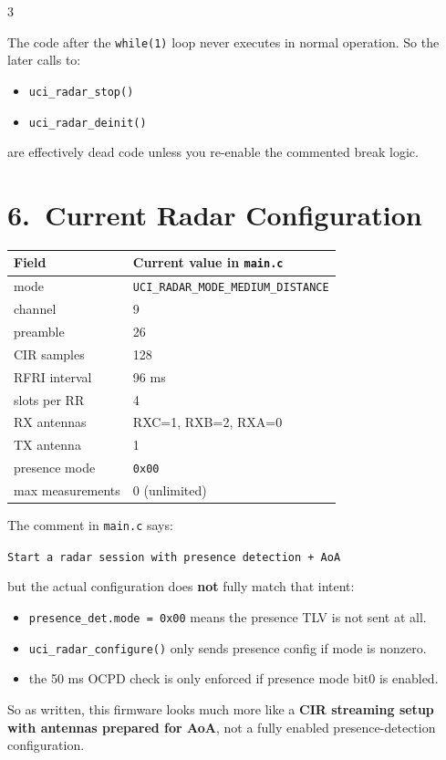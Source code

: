 \documentclass[10pt]{article}
\begin{document}
\begin{multicols*}{3}
\begin{tcolorbox}[warnbox={Very Important}]
The code after the \texttt{while(1)} loop never executes in normal operation.
So the later calls to:
\begin{itemize}
  \item \texttt{uci\_radar\_stop()}
  \item \texttt{uci\_radar\_deinit()}
\end{itemize}
are effectively dead code unless you re-enable the commented break logic.
\end{tcolorbox}

\section*{6.\ Current Radar Configuration}

\begin{tabular}{@{}p{2.5cm}p{4.8cm}@{}}
\toprule
Field & Current value in \texttt{main.c} \\
\midrule
mode & \texttt{UCI\_RADAR\_MODE\_MEDIUM\_DISTANCE} \\
channel & 9 \\
preamble & 26 \\
CIR samples & 128 \\
RFRI interval & 96 ms \\
slots per RR & 4 \\
RX antennas & RXC=1, RXB=2, RXA=0 \\
TX antenna & 1 \\
presence mode & \texttt{0x00} \\
max measurements & 0 (unlimited) \\
\bottomrule
\end{tabular}

\begin{tcolorbox}[warnbox={Reality Check: Intended vs Actual}]
The comment in \texttt{main.c} says:
\begin{center}
\texttt{Start a radar session with presence detection + AoA}
\end{center}
but the actual configuration does \textbf{not} fully match that intent:
\begin{itemize}
  \item \texttt{presence\_det.mode = 0x00} means the presence TLV is not sent at all.
  \item \texttt{uci\_radar\_configure()} only sends presence config if mode is nonzero.
  \item the 50 ms OCPD check is only enforced if presence mode bit0 is enabled.
\end{itemize}
So as written, this firmware looks much more like a \textbf{CIR streaming setup with antennas prepared for AoA}, not a fully enabled presence-detection configuration.
\end{tcolorbox}


\end{multicols*}
\end{document}
